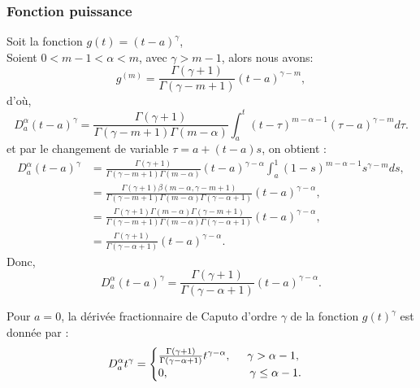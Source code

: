 \subsubsection*{Fonction puissance} 
Soit la fonction $g(t)=(t-a)^\gamma$,\\
Soient $ 0 < m-1 < \alpha < m$, avec $\gamma > m-1$, alors nous avons:\\
\begin{equation*}
    g^{(m)}= \frac{\Gamma(\gamma + 1)}{\Gamma(\gamma-m+1)}(t-a)^{\gamma-m},
\end{equation*}
d'où,
\begin{equation*}
    D_a^{\alpha}(t-a)^{\gamma} = \frac{\Gamma(\gamma +1)}{\Gamma(\gamma - m +1) \Gamma(m-\alpha)}\int_a^t(t-\tau)^{m-\alpha-1} (\tau -a)^{\gamma -m}d\tau.
\end{equation*}
    et par le changement de variable $\tau = a + (t-a)s$, on obtient :
    \begin{align*}
    D_a^{\alpha}(t-a)^{\gamma} &= \frac{\Gamma(\gamma +1)}{\Gamma(\gamma - m +1)\Gamma(m-\alpha)}(t-a)^{\gamma - \alpha} \int_a^1(1-s)^{m-\alpha-1} s^{\gamma-m}ds,\\
    &= \frac{\Gamma(\gamma+1)\beta(m-\alpha,\gamma-m+1)}{\Gamma(\gamma-m+1)\Gamma(m-\alpha)\Gamma(\gamma-\alpha+1)}(t-a)^{\gamma-\alpha},\\
    &= \frac{\Gamma(\gamma+1)\Gamma(m-\alpha)\Gamma(\gamma -m +1)}{\Gamma(\gamma-m +1)\Gamma(m-\alpha)\Gamma(\gamma-\alpha+1)}(t-a)^{\gamma-\alpha},\\
    &= \frac{\Gamma(\gamma +1)}{\Gamma(\gamma-\alpha+1)}(t-a)^{\gamma-\alpha}.
\end{align*}
Donc,
\begin{equation*}
    D_a^{\alpha}(t-a)^{\gamma} = \frac{\Gamma(\gamma+1)}{\Gamma(\gamma-\alpha+1)}(t-a)^{\gamma - \alpha}.
\end{equation*}
\begin{exemple}
Pour $a= 0$, la dérivée fractionnaire de Caputo d'ordre $\gamma$ de la fonction $g(t)^\gamma$ est donnée par :
\begin{equation*}
    {D}_a^{\alpha} t^{\gamma} =
    \begin{cases}
            \frac{\Gamma(\gamma +1)}{\Gamma(\gamma-\alpha+1)}t^{\gamma-\alpha}, \hspace{0.5cm} \gamma>\alpha-1,\\
            0, \hspace{2.51cm} \gamma \leq \alpha -1.
        \end{cases}
\end{equation*}
\end{exemple}


